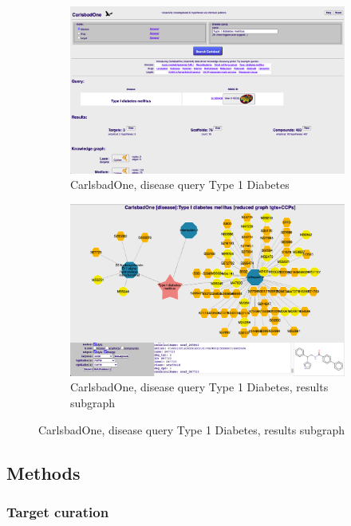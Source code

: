 \begin{figure}
\centering
\begin{subfigure}{0.8\textwidth}
\includegraphics[width=0.95\linewidth]{figures/carlsbad/CARLSBAD_CBOne_T1DM_01.png} 
\caption{CarlsbadOne, disease query Type 1 Diabetes}
\label{fig:cb_cbone_04}
\end{subfigure}
\begin{subfigure}{0.8\textwidth}
\includegraphics[width=0.95\linewidth]{figures/carlsbad/CARLSBAD_CBOne_T1DM_02.png}
\caption{CarlsbadOne, disease query Type 1 Diabetes, results subgraph}
\label{fig:cb_cbone_05}
\end{subfigure}
\caption{CarlsbadOne, disease query Type 1 Diabetes, results subgraph}
\label{fig:cb_cbone_06}
\end{figure}


\subsection{Methods}

\subsubsection{Target curation}

